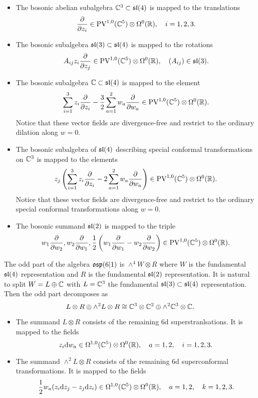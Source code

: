 \begin{itemize}

\item
The bosonic abelian subalgebra $\mathbb C^3 \subset \mathfrak{sl}(4)$ is mapped to the translations 
\[
\frac{\partial}{\partial z_i} \in {\rm PV}^{1,0}(\mathbb C^5) \otimes \Omega^0(\mathbb R) , \quad i=1,2,3.
\]

\item
The bosonic subalgebra $\mathfrak{sl}(3) \subset \mathfrak{sl}(4)$ is mapped to the 
rotations
\[
A_{ij} z_i \frac{\partial}{\partial z_j} \in {\rm PV}^{1,0}(\mathbb C^5)\otimes \Omega^0(\mathbb R) , \quad (A_{ij}) \in \mathfrak{sl}(3) .
\]

\item
The bosonic subalgebra $\mathbb C \subset \mathfrak{sl}(4)$ is mapped to the element
\[
\sum_{i=1}^3 z_i \frac{\partial}{\partial z_i} - \frac32 \sum_{a=1}^2 w_a \frac{\partial}{\partial w_a} \in {\rm PV}^{1,0}(\mathbb C^5) \otimes \Omega^0(\mathbb R)  .
\] 
Notice that these vector fields are divergence-free and restrict to the ordinary dilation along $w=0$. 
\item 
The bosonic subalgebra of $\mathfrak{sl}(4)$ describing special conformal transformations on $\mathbb C^3$ is mapped to the elements 
\[
z_j \left(\sum_{i=1}^3 z_i \frac{\partial}{\partial z_i} - 2 \sum_{a=1}^2 w_a \frac{\partial}{\partial w_a} \right) \in {\rm PV}^{1,0}(\mathbb C^5) \otimes \Omega^0(\mathbb R) .
\] 
Notice that these vector fields are divergence-free and restrict to the ordinary special conformal transformations along $w=0$. 
\item 
The bosonic summand $\mathfrak{sl}(2)$ is mapped to the triple
\[
w_1 \frac{\partial}{\partial w_2}, w_2 \frac{\partial}{\partial w_1}, \frac12 \left(w_1 \frac{\partial}{\partial w_1} - w_2 \frac{\partial}{\partial w_2}\right) \in {\rm PV}^{1,0}(\mathbb C^5) \otimes \Omega^0(\mathbb R) .
\]
\end{itemize}

The odd part of the algebra $\mathfrak{osp}(6|1)$ is $\wedge^4 W \otimes R$ where $W$ is the fundamental $\mathfrak{sl}(4)$ representation and $R$ is the fundamental $\mathfrak{sl}(2)$ representation. 
It is natural to split $W = L \oplus \mathbb C$ with $L = \mathbb C^3$ the fundamental $\mathfrak{sl}(3) \subset \mathfrak{sl}(4)$ representation. 
Then the odd part decomposes as
\[
L \otimes R \oplus \wedge^2 L \otimes R \cong \mathbb C^3 \otimes \mathbb C^2 \oplus \wedge^2 \mathbb C^3 \otimes \mathbb C .
\]

\begin{itemize} 
\item The summand $L \otimes R$ consists of the remaining 6d superstranlsations. 
It is mapped to the fields 
\[
z_i {\rm d} w_a \in \Omega^{1,0}(\mathbb C^5) \otimes \Omega^0(\mathbb R) ,\quad a=1,2, \quad i =1,2,3.
\] 
\item The summand $\wedge^2 L \otimes R$ consists of the remaining 6d superconformal transformations. 
It is mapped to the fields
\[
\frac12 w_a (z_i {\rm d} z_j - z_j {\rm d} z_i) \in \Omega^{1,0}(\mathbb C^5)\otimes \Omega^0(\mathbb R) , \quad a = 1,2, \quad k = 1,2,3. 
\]
\end{itemize}

